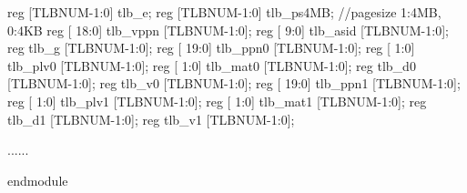 \begin{CodeBlock}[language=BookVerilog]
reg  [TLBNUM-1:0] tlb_e;
reg  [TLBNUM-1:0] tlb_ps4MB; //pagesize 1:4MB, 0:4KB
reg  [      18:0] tlb_vppn     [TLBNUM-1:0];
reg  [       9:0] tlb_asid     [TLBNUM-1:0];
reg               tlb_g        [TLBNUM-1:0];
reg  [      19:0] tlb_ppn0     [TLBNUM-1:0];
reg  [       1:0] tlb_plv0     [TLBNUM-1:0];
reg  [       1:0] tlb_mat0     [TLBNUM-1:0];
reg               tlb_d0       [TLBNUM-1:0];
reg               tlb_v0       [TLBNUM-1:0];
reg  [      19:0] tlb_ppn1     [TLBNUM-1:0];
reg  [       1:0] tlb_plv1     [TLBNUM-1:0];
reg  [       1:0] tlb_mat1     [TLBNUM-1:0];
reg               tlb_d1       [TLBNUM-1:0];
reg               tlb_v1       [TLBNUM-1:0];

......

endmodule
\end{CodeBlock}
